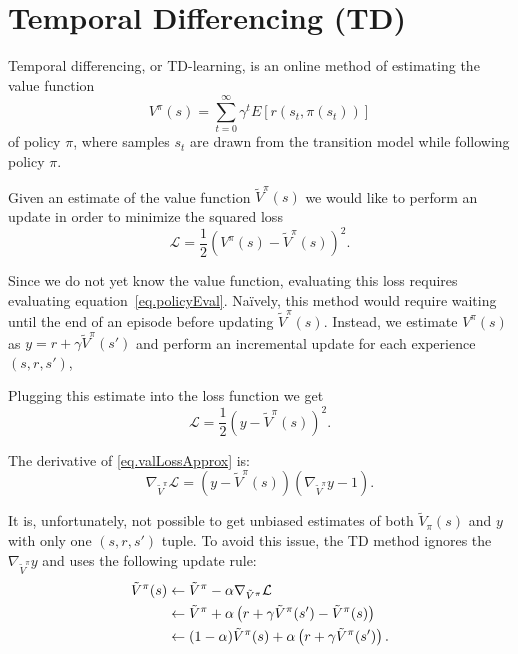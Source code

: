 \documentclass[11pt]{article}
\numberwithin{equation}{section}
\numberwithin{figure}{section}
\begin{document}
\section{Temporal Differencing (TD)}
Temporal differencing, or TD-learning, is an online method of estimating the
value function
\begin{equation}
	V^\pi(s) = \sum_{t = 0}^\infty \gamma^t E\left[ r(s_t,\pi(s_t)) \right]
	\label{eq.policyEval}
\end{equation}
of policy $\pi$, where samples $s_t$ are drawn from the transition model while
following policy $\pi$.

Given an estimate of the value function $\tilde{V}^\pi(s)$ we would like to
perform an update in order to minimize the squared loss
\begin{equation}
	\mathcal{L} = \frac{1}{2} \left(V^\pi(s) - \tilde{V}^\pi(s) \right)^2.
	\label{eq.valLoss}
\end{equation}

Since we do not yet know the value function, evaluating this loss requires
evaluating equation~\ref{eq.policyEval}. Na\"{i}vely, this method would require
waiting until the end of an episode before updating $\tilde{V}^\pi(s)$. Instead,
we estimate $V^\pi(s)$ as $y = r + \gamma \tilde{V}^\pi(s')$ and perform an
incremental update for each experience $(s, r, s')$,

Plugging this estimate into the loss function we get
\begin{equation}
	\mathcal{L} = \frac{1}{2} \left(y - \tilde{V}^\pi(s) \right)^2.
	\label{eq.valLossApprox}
\end{equation}

The derivative of \cref{eq.valLossApprox} is:
\begin{equation}
    \nabla_{\tilde{V}^\pi}\mathcal{L} = \left(y - \tilde{V}^\pi(s) \right) \left(\nabla_{\tilde{V}^\pi} y - 1 \right).
    \label{eq.valGrad}
\end{equation}

It is, unfortunately, not possible to get unbiased estimates of both
$\tilde{V}_\pi(s)$ and $y$ with only one $(s,r,s')$ tuple. To avoid this issue,
the TD method ignores the $\nabla_{\tilde{V}^\pi} y$ and uses the following update
rule:
\begin{align}
    \tilde{V}^\pi(s) &\leftarrow  \tilde{V}^\pi - \alpha \nabla_{\tilde{V}^\pi}\mathcal{L} \notag \\
                     &\leftarrow  \tilde{V}^\pi + \alpha \left(r + \gamma \tilde{V}^\pi(s') - \tilde{V}^\pi(s) \right) \notag \\
                     &\leftarrow  (1 - \alpha) \tilde{V}^\pi(s) + \alpha \left(r+ \gamma \tilde{V}^\pi(s') \right). 
    \label{eq.valUpdate}
\end{align}
\end{document}
